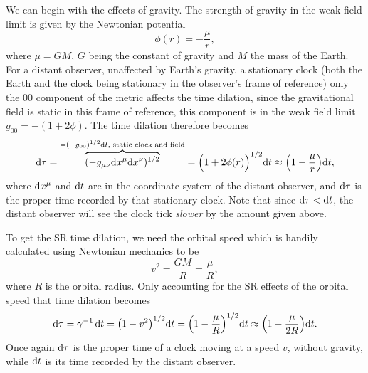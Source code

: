 \documentclass[11pt,a4paper, 
swedish, english %
]{article}
\begin{document}
We can begin with the effects of gravity. The strength of gravity in
the weak field limit is given by the Newtonian potential
\begin{equation}\label{eq3:phi}
\phi(r)=-\frac{\mu}{r},
\end{equation}
where $\mu=GM$, $G$ being the constant of gravity and $M$ the mass
of the Earth. For a distant observer, unaffected by Earth's gravity,
a stationary clock (both the Earth and the clock being stationary in
the observer's frame of reference) only the 00 component of the metric
affects the time dilation, since the gravitational field is static in
this frame of reference, this component is in the weak field limit
$g_{00}=-(1+2\phi)$. The time dilation therefore becomes 
\begin{equation}
\mathrm{d}\tau=
\overbrace{(-g_{\mu\nu}\mathrm{d}{x}^\mu\mathrm{d}{x}^\nu)^{1/2}}
^{=(-g_{00})^{1/2}\mathrm{d}{t},\text{ static clock and field}}
=\Big(1+2\phi(r)\Big)^{1/2}\mathrm{d}{t}
\approx\qty(1-\frac{\mu}{r})\mathrm{d}{t},
\end{equation}
where $\mathrm{d}{x}^\mu$ and $\mathrm{d}{t}$ are in the coordinate system of the distant
observer, and $\mathrm{d}\tau$ is the proper time recorded by that stationary
clock. Note that since $\mathrm{d}\tau<\mathrm{d}{t}$, the distant observer
will see the clock tick \emph{slower}\footnotemark{} by the amount
given above.  


To get the SR time dilation, we need the orbital speed which is
handily calculated using Newtonian mechanics to be
\begin{equation}
v^2=\frac{GM}{R}=\frac{\mu}{R},
\end{equation}
where $R$ is the orbital radius. Only accounting for the SR effects of
the orbital speed that time dilation becomes
\begin{equation}
\mathrm{d}\tau=\gamma^{-1}\,\mathrm{d}{t}=\qty(1-v^2)^{1/2}\mathrm{d}{t}
=\qty(1-\frac{\mu}{R})^{1/2}\mathrm{d}{t}
\approx\qty(1-\frac{\mu}{2R})\mathrm{d}{t}.
\end{equation}
Once again $\mathrm{d}\tau$ is the proper time of a clock moving at a speed
$v$, without gravity, while $\mathrm{d}{t}$ is its time recorded by the
distant observer. 
\end{document}
